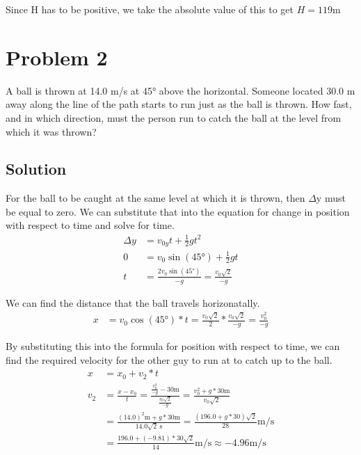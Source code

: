 \documentclass[12pt]{article}
\begin{document}
Since H has to be positive, we take the absolute value of this to get $\boxed{ H = 119\unit{\meter} }$

\pagebreak
\section*{Problem 2}
A ball is thrown at 14.0 m/s at 45\unit{\degree} above the horizontal. Someone located 30.0 m away along the line of the path starts to run just as the ball is thrown. How fast, and in which direction, must the person run to catch the ball at the level from which it was thrown?

\subsection*{Solution}
For the ball to be caught at the same level at which it is thrown, then $\Delta$y must be equal to zero. We can substitute that into the equation for change in position with respect to time and solve for time.
\begin{align}
    \Delta y &= v_{0y}t + \frac{1}{2}gt^2\\
    0 &= v_0\sin(45\unit{\degree}) + \frac{1}{2}gt\\
    t &= \frac{2v_0 \sin(45\unit{\degree})}{-g} = \frac{v_0 \sqrt{2}}{-g}
\end{align}

We can find the distance that the ball travels horizonatally.
\begin{align}
    x &= v_0 \cos(45\unit{\degree})*t = \frac{v_0 \sqrt{2}}{2} * \frac{v_0 \sqrt{2}}{-g} = \frac{v_0^2}{-g}
\end{align}

By substituting this into the formula for position with respect to time, we can find the required velocity for the other guy to run at to catch up to the ball. 
\begin{align}
    x &= x_0 + v_2 * t\\
    v_2 &= \frac{x - x_0}{t} = \frac{\frac{v_0^2}{-g} - 30\unit{\meter}}{\frac{v_0 \sqrt{2}}{-g}}
        = \frac{v_0^2 + g*30\unit{\meter}}{v_0\sqrt{2}}\\
        &= \frac{(14.0)^2 \unit{\meter} + g*30\unit{\meter}}{14.0\sqrt{2}\ \unit{\second}} = \frac{(196.0 + g*30)\sqrt{2}}{28} \unit{\m/\s}\\
        &= \frac{196.0 + (-9.81)*30\sqrt{2}}{14} \unit{\m/\s} \approx \boxed{-4.96 \unit{\m/\s}}
\end{align}
\end{document}
